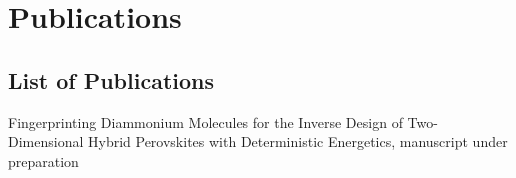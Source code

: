 \chapter{Publications}

\section*{List of Publications}
 
Fingerprinting Diammonium Molecules for the Inverse Design of Two-Dimensional Hybrid Perovskites with Deterministic Energetics, manuscript under preparation



